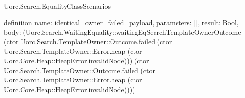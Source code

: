 \begin{lexlean}{Uorc.Search.EqualityClassScenarios}
\begin{semanticmodule}
definition{
  name: identical_owner_failed_payload,
  parameters: [],
  result: Bool,
  body: (Uorc.Search.WaitingEquality::waitingEqSearchTemplateOwnerOutcome (ctor Uorc.Search.TemplateOwner::Outcome.failed (ctor Uorc.Search.TemplateOwner::Error.heap (ctor Uorc.Core.Heap::HeapError.invalidNode))) (ctor Uorc.Search.TemplateOwner::Outcome.failed (ctor Uorc.Search.TemplateOwner::Error.heap (ctor Uorc.Core.Heap::HeapError.invalidNode))))
}
\end{semanticmodule}
\end{lexlean}
